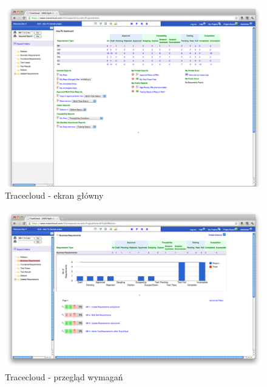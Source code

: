         \begin{figure}[t]
          \centering
          \includegraphics[width=1.0\textwidth]{img/tracecloud_2.pdf}
          \caption{Tracecloud - ekran główny}
          \label{fig:tracecloud_2}
        \end{figure}

        \begin{figure}[t]
          \centering
          \includegraphics[width=1.0\textwidth]{img/tracecloud_3.pdf}
          \caption{Tracecloud - przegląd wymagań}
          \label{fig:tracecloud_3}
        \end{figure}

